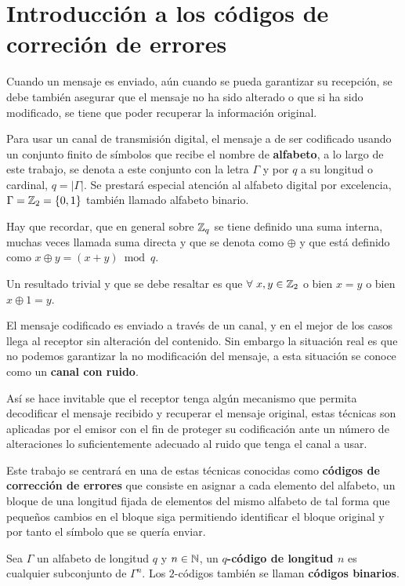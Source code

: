 \section{Introducción a los códigos de correción de errores}

Cuando un mensaje es enviado, aún cuando se pueda garantizar su recepción, se debe también asegurar que el mensaje no ha sido alterado o que si ha sido modificado, se tiene que poder recuperar la información original.

Para usar un canal de transmisión digital, el mensaje a de ser codificado usando un conjunto finito de símbolos que recibe el nombre de \textbf{alfabeto}, a lo largo de este trabajo, se denota a este conjunto con la letra $\Gamma$ y por $q$ a su longitud o cardinal, $q=|\Gamma|$.
Se prestará especial atención al alfabeto digital por excelencia, $\Gamma = \mathbb{Z}_2 = \left\{0, 1\right\}$ también llamado alfabeto binario.

Hay que recordar, que en general sobre $\mathbb{Z}_q$ se tiene definido una suma interna, muchas veces llamada suma directa y que se denota como $\oplus$ y que está definido como $x\oplus y = (x+y)\bmod q$.

Un resultado trivial y que se debe resaltar es que $\forall\ x,y\in\mathbb{Z}_2$ o bien $x=y$ o bien $x\oplus 1=y$.

El mensaje codificado es enviado a través de un canal, y en el mejor de los casos llega al receptor sin alteración del contenido.
Sin embargo la situación real es que no podemos garantizar la no modificación del mensaje, a esta situación se conoce como un \textbf{canal con ruido}.

Así se hace invitable que el receptor tenga algún mecanismo que permita decodificar el mensaje recibido y recuperar el mensaje original, estas técnicas son aplicadas por el emisor con el fin de proteger su codificación ante un número de alteraciones lo suficientemente adecuado al ruido que tenga el canal a usar.

Este trabajo se centrará en una de estas técnicas conocidas como \textbf{códigos de corrección de errores} que consiste en asignar a cada elemento del alfabeto, un bloque de una longitud fijada de elementos del mismo alfabeto de tal forma que pequeños cambios en el bloque siga permitiendo identificar el bloque original y por tanto el símbolo que se quería enviar.

\begin{definition}
	Sea $\Gamma$ un alfabeto de longitud $q$ y $n\in\mathbb{N}$, un \textbf{$q$-código de longitud $n$} es cualquier subconjunto de $\Gamma^n$.
	Los $2$-códigos también se llaman \textbf{códigos binarios}.
\end{definition}


